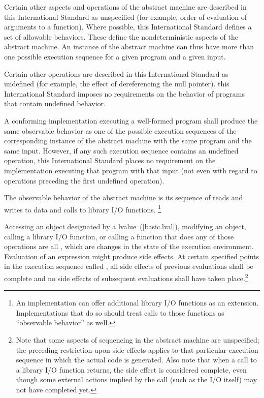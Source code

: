 %
\pnum
Certain other aspects and operations of the abstract machine are
described in this International Standard as unspecified (for example,
order of evaluation of arguments to a function). Where possible, this
International Standard defines a set of allowable behaviors. These
define the nondeterministic aspects of the abstract machine. An instance
of the abstract machine can thus have more than one possible execution
sequence for a given program and a given input.

%
\pnum
Certain other operations are described in this International Standard as
undefined (for example, the effect of dereferencing  the null pointer).
\enternote this International Standard imposes no requirements on the
behavior of programs that contain undefined behavior. \exitnote

%
\pnum
A conforming implementation executing a well-formed program shall
produce the same observable behavior as one of the possible execution
sequences of the corresponding instance of the abstract machine with the
same program and the same input. However, if any such execution sequence
contains an undefined operation, this International Standard places no
requirement on the implementation executing that program with that input
(not even with regard to operations preceding the first undefined
operation).

%
\pnum
The observable behavior of the abstract machine is its sequence of reads
and writes to  data and calls to library I/O functions.
\footnote{An implementation can offer additional library I/O functions as
an extension. Implementations that do so should treat calls to those
functions as ``observable behavior'' as well.}

\pnum
Accessing an object designated by a  lvalue~(\ref{basic.lval}),
modifying an object, calling a library I/O function, or calling a function
that does any of those operations are all , which are
changes in the state of the execution environment.
Evaluation of an expression might produce side effects.
At certain specified points in the execution sequence called
, all side effects of previous evaluations
shall be complete and no side effects of subsequent evaluations shall
have taken place.\footnote{Note that some aspects of sequencing in the
abstract machine are unspecified; the preceding restriction upon side effects
applies to that particular execution sequence in which the actual code is
generated.  Also note that when a call to a library I/O function returns,
the side effect is considered complete, even though some external actions
implied by the call (such as the I/O itself) may not have completed yet.}

